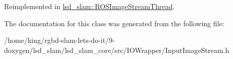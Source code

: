 Reimplemented in \hyperlink{classlsd__slam_1_1_r_o_s_image_stream_thread_a8d20574101837956cdebe14761c368fc}{lsd\-\_\-slam\-::\-R\-O\-S\-Image\-Stream\-Thread}.



The documentation for this class was generated from the following file\-:\begin{DoxyCompactItemize}
\item 
/home/king/rgbd-\/slam-\/lets-\/do-\/it/9-\/doxygen/lsd\-\_\-slam/lsd\-\_\-slam\-\_\-core/src/\-I\-O\-Wrapper/Input\-Image\-Stream.\-h\end{DoxyCompactItemize}
